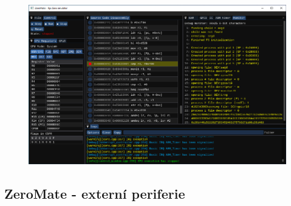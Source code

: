 \documentclass[compress]{beamer}
\begin{document}
\begin{frame}
\begin{overlayarea}{\textwidth}{\textheight}
\begin{figure}
{			}%
			\only<5>
			{%
				\includegraphics[width=.85\textwidth]{img/gui/05.pdf}%
			}%
		\end{figure}
	\end{overlayarea}      
\end{frame}

\subsection{ZeroMate - externí periferie}
\end{document}
